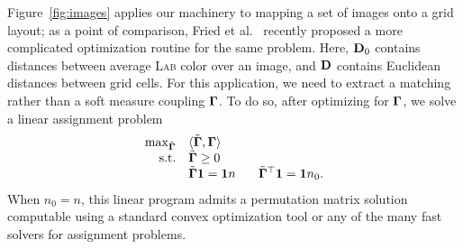 Figure~\ref{fig:images} applies our machinery to mapping a set of images onto a grid layout; as a point of comparison, Fried et al.~ recently proposed a more complicated optimization routine for the same problem.  Here, $\mathbf D_0$ contains distances between average \textsc{Lab} color over an image, and $\mathbf D$ contains Euclidean distances between grid cells.  For this application, we need to extract a matching rather than a soft measure coupling $\mathbf \Gamma$.  To do so, after optimizing for $\mathbf \Gamma$, we solve a linear assignment problem
$$
\begin{array}{rl}
\max_{\tilde{\mathbf \Gamma}} & \langle \tilde {\mathbf \Gamma},\mathbf \Gamma\rangle\\
\textrm{s.t.} & \tilde{\mathbf \Gamma}\geq0\\
&\tilde{\mathbf \Gamma}\mathbf 1=\mathbf 1n\hspace{.25in}\tilde{\mathbf \Gamma}^\top\mathbf 1=\mathbf 1n_0.
\end{array}
$$
When $n_0=n$, this linear program admits a permutation matrix solution computable using a standard convex optimization tool or any of the many fast solvers for assignment problems.%

